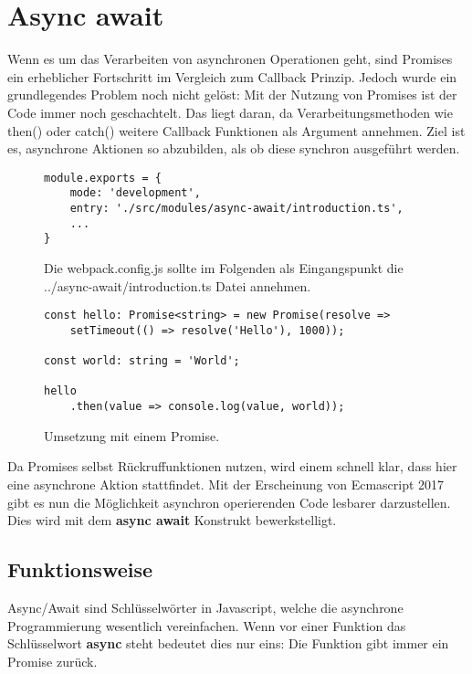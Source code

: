 \section{Async await}
Wenn es um das Verarbeiten von asynchronen Operationen geht, sind Promises ein erheblicher Fortschritt im Vergleich zum Callback Prinzip. Jedoch wurde ein grundlegendes Problem noch nicht gelöst: Mit der Nutzung von Promises ist der Code immer noch geschachtelt. Das liegt daran, da Verarbeitungsmethoden wie then() oder catch() weitere Callback Funktionen als Argument annehmen. Ziel ist es, asynchrone Aktionen so abzubilden, als ob diese synchron ausgeführt werden. 

\begin{figure}[H]
\begin{lstlisting}[basicstyle=\small]
module.exports = {
    mode: 'development',
    entry: './src/modules/async-await/introduction.ts',
    ...
}
\end{lstlisting}
\caption{Die webpack.config.js sollte im Folgenden als Eingangspunkt die ../async-await/introduction.ts Datei annehmen.}
\end{figure}

\begin{figure}[H]
\begin{lstlisting}[basicstyle=\small]
const hello: Promise<string> = new Promise(resolve =>
    setTimeout(() => resolve('Hello'), 1000));
    
const world: string = 'World';

hello
    .then(value => console.log(value, world));
\end{lstlisting}
\caption{Umsetzung mit einem Promise.}
\label{Promise-comparison-async-await}
\end{figure}

\noindent
Da Promises selbst Rückruffunktionen nutzen, wird einem schnell klar, dass hier eine asynchrone Aktion stattfindet. Mit der Erscheinung von Ecmascript 2017 gibt es nun die Möglichkeit asynchron operierenden Code lesbarer darzustellen. Dies wird mit dem \textbf{async await} Konstrukt bewerkstelligt. 

\subsection{Funktionsweise}

Async/Await sind Schlüsselwörter in Javascript, welche die asynchrone Programmierung wesentlich vereinfachen. Wenn vor einer Funktion das Schlüsselwort \textbf{async} steht bedeutet dies nur eins: Die Funktion gibt immer ein Promise zurück.

